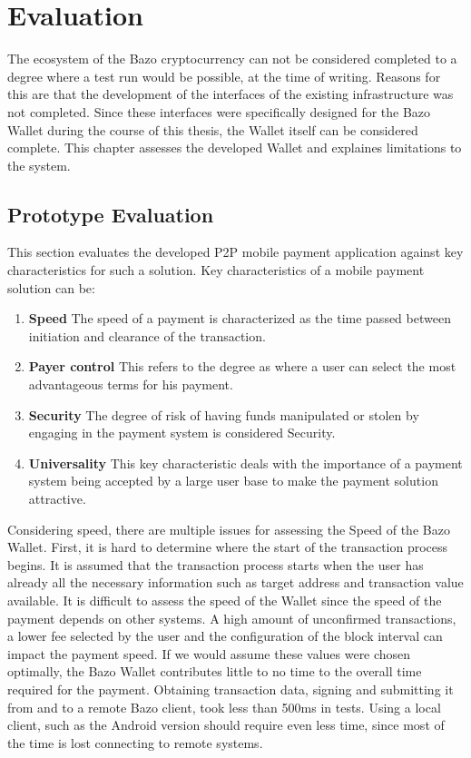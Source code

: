 \chapter{Evaluation}
The ecosystem of the Bazo cryptocurrency can not be considered completed to a degree where a test run would be possible, at the time of writing. Reasons for this are that the development of the interfaces of the existing infrastructure was not completed. Since these interfaces were specifically designed for the Bazo Wallet during the course of this thesis, the Wallet itself can be considered complete. This chapter assesses the developed Wallet and explaines limitations to the system.
\section{Prototype Evaluation}
This section evaluates the developed P2P mobile payment application against key characteristics for such a solution. Key characteristics of a mobile payment solution can be:
\begin{enumerate}
\item \textbf{Speed}
The speed of a payment is characterized as the time passed between initiation and clearance of the transaction.
\item \textbf{Payer control}
This refers to the degree as where a user can select the most advantageous terms for his payment.
\item \textbf{Security}
The degree of risk of having funds manipulated or stolen by engaging in the payment system is considered Security.
\item \textbf{Universality}
This key characteristic deals with the importance of a payment system being accepted by a large user base to make the payment solution attractive.
\end{enumerate}

Considering speed, there are multiple issues for assessing the Speed of the Bazo Wallet. First, it is hard to determine where the start of the transaction process begins. It is assumed that the transaction process starts when the user has already all the necessary information such as target address and transaction value available. It is difficult to assess the speed of the Wallet since the speed of the payment depends on other systems. A high amount of unconfirmed transactions, a lower fee selected by the user and the configuration of the block interval can impact the payment speed. If we would assume these values were chosen optimally, the Bazo Wallet contributes little to no time to the overall time required for the payment. Obtaining transaction data, signing and submitting it from and to a remote Bazo client, took less than 500ms in tests. Using a local client, such as the Android version should require even less time, since most of the time is lost connecting to remote systems.

